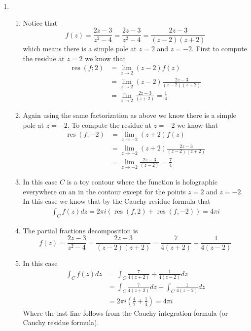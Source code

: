 \documentclass[12pt]{amsart}
\theoremstyle{definition}
\DeclareMathOperator{\res}{\mathrm{res}}
\newcommand{\ra}{\rightarrow}
\begin{document}
\begin{enumerate}
\item 
    \begin{enumerate}
    \item Notice that $$f(z)=\frac{2z-3}{z^2-4}=\frac{2z-3}{z^2-4}=\frac{2z-3}{(z-2)(z+2)}$$ 
    which means there is a simple pole at $z=2$ and $z=-2$. First to compute the residue at $z=2$ we know that 
    \begin{align*}
        \res(f;2)&=\lim_{z\ra 2}(z-2)f(z)\\
        &=\lim_{z\ra 2}(z-2)\frac{2z-3}{(z-2)(z+2)}\\
        &=\lim_{z\ra 2}\frac{2z-3}{(z+2)}=\frac{1}{4}
    \end{align*}
    \item Again using the same factorization as above we know there is a simple pole at $z=-2$. To compute the residue at $z=-2$ we know that 
    \begin{align*}
        \res(f;-2)&=\lim_{z\ra -2}(z+2)f(z)\\
        &=\lim_{z\ra -2}(z+2)\frac{2z-3}{(z-2)(z+2)}\\
        &=\lim_{z\ra -2}\frac{2z-3}{(z-2)}=\frac{7}{4}
    \end{align*}

    \item In this case $C$ is a toy contour where the function is holographic everywhere on an in the contour except for the points $z=2$ and $z=-2$. In this case we know that by the Cauchy residue formula that
    \begin{align*}
        \int_C f(z)dz=2\pi i (\res(f,2)+\res(f,-2))=4\pi i
    \end{align*}

    \item The partial fractions decomposition is 
    $$f(z)=\frac{2z-3}{z^2-4}=\frac{2z-3}{(z-2)(z+2)}=\frac{7}{4(z+2)}+\frac{1}{4(z-2)}$$ 
    \item In this case 
    \begin{align*}
        \int_C f(z)dz&=\int_C \frac{7}{4(z+2)}+\frac{1}{4(z-2)}dz\\
        &=\int_C \frac{7}{4(z+2)}dz+\int_C\frac{1}{4(z-2)}dz\\
        &=2\pi i(\frac{4}{7}+\frac{1}{4}) = 4\pi i
    \end{align*}
    Where the last line follows from the Cauchy integration formula (or Cauchy residue formula).\\
    \end{enumerate}


\end{enumerate}
\end{document}
